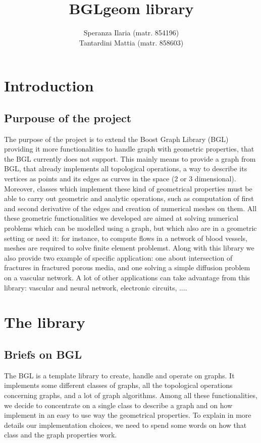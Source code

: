 \documentclass[11pt]{article} %
\title{BGLgeom library}
\author{Speranza Ilaria (matr. 854196) \\ Tantardini Mattia (matr. 858603)}
\begin{document}
\maketitle
\newpage
\tableofcontents
\newpage

\section{Introduction}
	\subsection{Purpouse of the project}	%
	The purpose of the project is to extend the Boost Graph Library (BGL) providing it more functionalities to handle graph with geometric properties, that the BGL currently does not support. This mainly means to provide a graph from BGL, that already implements all topological operations, a way to describe its vertices as points and its edges as curves in the space (2 or 3 dimensional). Moreover, classes which implement these kind of geometrical properties must be able to carry out geometric and analytic operations, such as computation of first and second derivative of the edges and creation of numerical meshes on them. \newline
	All these geometric functionalities we developed are aimed at solving numerical problems which can be modelled using a graph, but which also are in a geometric setting or need it: for instance, to compute flows in a network of blood vessels, meshes are required to solve finite element problemst. \newline
	Along with this library we also provide two example of specific application: one about intersection of fractures in fractured porous media, and one solving a simple diffusion problem on a vascular network. \newline
	A lot of other applications can take advantage from this library: vascular and neural network, electronic circuits, .... 


\section{The library}
	\subsection{Briefs on BGL}
	The BGL is a template library to create, handle and operate on graphs. It implements some different classes of graphs, all the topological operations concerning graphs, and a lot of graph algorithms.
	\newline\newline
	Among all these functionalities, we decide to concentrate on a single class to describe a graph and on how implement in an easy to use way the geometrical properties. To explain in more details our implementation choices, we need to spend some words on how that class and the graph properties work.
	
\end{document}
